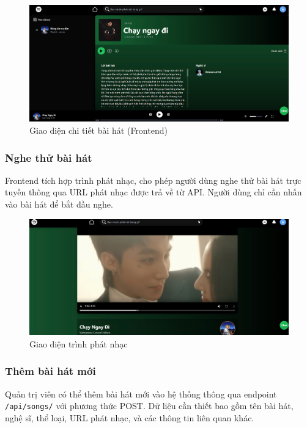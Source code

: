\begin{figure}[H]
    \centering
    \includegraphics[width=1\textwidth]{latex/imgs/frontend-song-detail.jpg}
    \caption{Giao diện chi tiết bài hát (Frontend)}
\end{figure}

\subsubsection{Nghe thử bài hát}
Frontend tích hợp trình phát nhạc, cho phép người dùng nghe thử bài hát trực tuyến thông qua URL phát nhạc được trả về từ API. Người dùng chỉ cần nhấn vào bài hát để bắt đầu nghe.

\begin{figure}[H]
    \centering
    \includegraphics[width=1\textwidth]{latex/imgs/frontend-player.jpg}
    \caption{Giao diện trình phát nhạc}
\end{figure}

\subsubsection{Thêm bài hát mới}
Quản trị viên có thể thêm bài hát mới vào hệ thống thông qua endpoint \texttt{/api/songs/} với phương thức POST. Dữ liệu cần thiết bao gồm tên bài hát, nghệ sĩ, thể loại, URL phát nhạc, và các thông tin liên quan khác.

